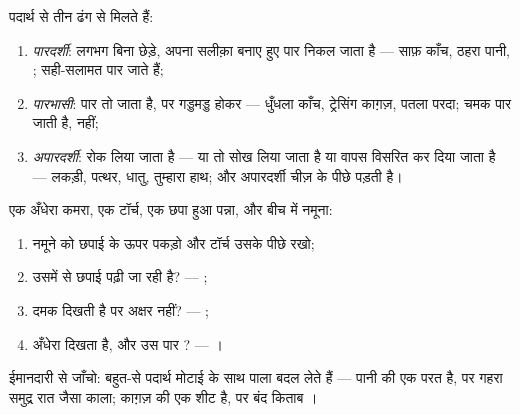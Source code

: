 \begin{definition}\label{def:g7:light-sources-propagation:coats}
पदार्थ  से तीन ढंग से मिलते हैं:
\begin{enumerate}
  \item \emph{पारदर्शी}:  लगभग बिना छेड़े,
        अपना सलीक़ा बनाए हुए पार निकल जाता है --- साफ़ काँच, ठहरा
        पानी, ;  सही-सलामत पार जाते हैं;
  \item \emph{पारभासी}:  पार तो जाता है, पर
        गड्डमड्ड होकर --- धुँधला काँच, ट्रेसिंग काग़ज़, पतला परदा;
        चमक पार जाती है,  नहीं;
  \item \emph{अपारदर्शी}:  रोक लिया जाता है
        --- या तो सोख लिया जाता है या वापस विसरित कर दिया जाता है
        --- लकड़ी, पत्थर, धातु, तुम्हारा हाथ; और अपारदर्शी चीज़ के
        पीछे  पड़ती है।
\end{enumerate}
\end{definition}

\begin{method}[टॉर्च की रोशनी में पदार्थ छाँटना]\label{met:g7:light-sources-propagation:sort}
एक अँधेरा कमरा, एक टॉर्च, एक छपा हुआ पन्ना, और बीच में नमूना:
\begin{enumerate}
  \item नमूने को छपाई के ऊपर पकड़ो और टॉर्च उसके पीछे रखो;
  \item उसमें से छपाई पढ़ी जा रही है? --- ;
  \item दमक दिखती है पर अक्षर नहीं? --- ;
  \item अँधेरा दिखता है, और उस पार ? --- ।
\end{enumerate}
ईमानदारी से जाँचो: बहुत-से पदार्थ मोटाई के साथ पाला बदल लेते हैं ---
पानी की एक परत  है, पर गहरा समुद्र रात जैसा काला; काग़ज़ की एक
शीट  है, पर बंद किताब ।
\end{method}

